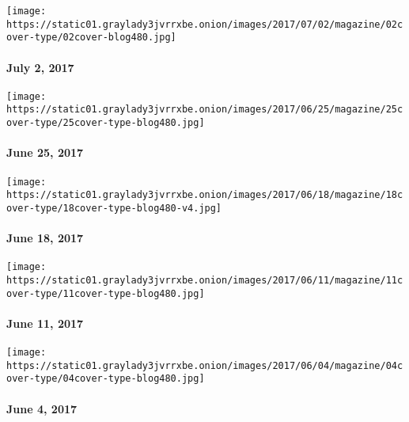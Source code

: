 \href{https://www.nytimes3xbfgragh.onion/issue/magazine/2017/06/30/magazine-index-20170702}{}

\texttt{[image: https://static01.graylady3jvrrxbe.onion/images/2017/07/02/magazine/02cover-type/02cover-blog480.jpg]}

\hypertarget{july-2-2017}{%
\paragraph{July 2, 2017}\label{july-2-2017}}

\href{https://www.nytimes3xbfgragh.onion/issue/magazine/2017/06/23/magazine-index-20170625}{}

\texttt{[image: https://static01.graylady3jvrrxbe.onion/images/2017/06/25/magazine/25cover-type/25cover-type-blog480.jpg]}

\hypertarget{june-25-2017}{%
\paragraph{June 25, 2017}\label{june-25-2017}}

\href{https://www.nytimes3xbfgragh.onion/issue/magazine/2017/06/16/magazine-index-20170618}{}

\texttt{[image: https://static01.graylady3jvrrxbe.onion/images/2017/06/18/magazine/18cover-type/18cover-type-blog480-v4.jpg]}

\hypertarget{june-18-2017}{%
\paragraph{June 18, 2017}\label{june-18-2017}}

\href{https://www.nytimes3xbfgragh.onion/issue/magazine/2017/06/09/the-61117-issue-20170611}{}

\texttt{[image: https://static01.graylady3jvrrxbe.onion/images/2017/06/11/magazine/11cover-type/11cover-type-blog480.jpg]}

\hypertarget{june-11-2017}{%
\paragraph{June 11, 2017}\label{june-11-2017}}

\href{https://www.nytimes3xbfgragh.onion/issue/magazine/2017/06/02/magazine-index-20170604}{}

\texttt{[image: https://static01.graylady3jvrrxbe.onion/images/2017/06/04/magazine/04cover-type/04cover-type-blog480.jpg]}

\hypertarget{june-4-2017}{%
\paragraph{June 4, 2017}\label{june-4-2017}}

